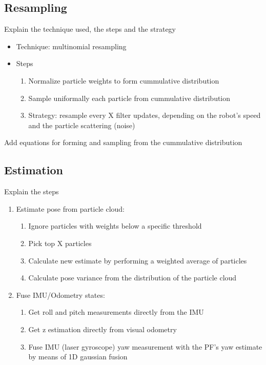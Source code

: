 \subsection{Resampling}

Explain the technique used, the steps and the strategy

\begin{itemize}
    \item Technique: multinomial resampling
    \item Steps
        \begin{enumerate}
            \item Normalize particle weights to form cummulative distribution
            \item Sample uniformally each particle from cummulative distribution
            \item Strategy: resample every X filter updates, depending on the robot's speed and the particle scattering (noise)
        \end{enumerate}
\end{itemize}

\noindent
Add equations for forming and sampling from the cummulative distribution

\subsection{Estimation}

Explain the steps

\begin{enumerate}
    \item Estimate pose from particle cloud:
        \begin{enumerate}
            \item Ignore particles with weights below a specific threshold
            \item Pick top X particles
            \item Calculate new estimate by performing a weighted average of particles
            \item Calculate pose variance from the distribution of the particle cloud
        \end{enumerate}
    \item Fuse IMU/Odometry states:
        \begin{enumerate}
            \item Get roll and pitch measurements directly from the IMU
            \item Get z estimation directly from visual odometry
            \item Fuse IMU (laser gyroscope) yaw measurement with the PF's yaw estimate by means of 1D gaussian fusion
        \end{enumerate}
\end{enumerate}

